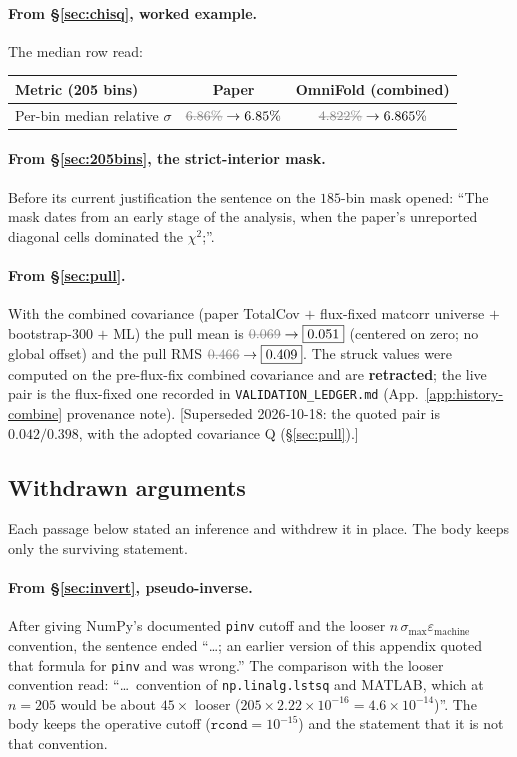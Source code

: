 \paragraph{From \S\ref{sec:chisq}, worked example.} The median row read:
\begin{center}
\begin{tabular}{@{}lcc@{}}
\toprule
Metric (205 bins) & Paper & OmniFold (combined) \\
\midrule
Per-bin median relative $\sigma$ & $\dead{6.86\%} \to \uqPaper\%$ & $\dead{4.822\%} \to 6.865\%$ \\
\bottomrule
\end{tabular}
\end{center}

\paragraph{From \S\ref{sec:205bins}, the strict-interior mask.} Before its current justification the sentence on the $185$-bin mask opened: ``The mask dates from an early stage of the analysis, when the paper's unreported diagonal cells dominated the $\chi^{2}$;''.

\paragraph{From \S\ref{sec:pull}.} With the combined covariance (paper TotalCov $+$ flux-fixed matcorr universe $+$ bootstrap-300 $+$ ML) the pull mean is $\dead{0.069} \to \boxed{0.051}$ (centered on zero; no global offset) and the pull RMS $\dead{0.466} \to \boxed{0.409}$. The struck values were computed on the pre-flux-fix combined covariance and are \textbf{retracted}; the live pair is the flux-fixed one recorded in \texttt{VALIDATION\_LEDGER.md} (App.~\ref{app:history-combine} provenance note). [Superseded 2026-10-18: the quoted pair is $0.042/0.398$, with the adopted covariance Q (\S\ref{sec:pull}).]

\subsection{Withdrawn arguments}
\label{app:history-withdrawn}

Each passage below stated an inference and withdrew it in place. The body keeps only the surviving statement.

\paragraph{From \S\ref{sec:invert}, pseudo-inverse.} After giving NumPy's documented \texttt{pinv} cutoff and the looser $n\,\sigma_{\max}\varepsilon_{\text{machine}}$ convention, the sentence ended ``\ldots; an earlier version of this appendix quoted that formula for \texttt{pinv} and was wrong.'' The comparison with the looser convention read: ``\ldots\ convention of \texttt{np.linalg.lstsq} and MATLAB, which at $n=205$ would be about $45\times$ looser ($205\times2.22\times10^{-16}=4.6\times10^{-14}$)''. The body keeps the operative cutoff ($\texttt{rcond}=10^{-15}$) and the statement that it is not that convention.

